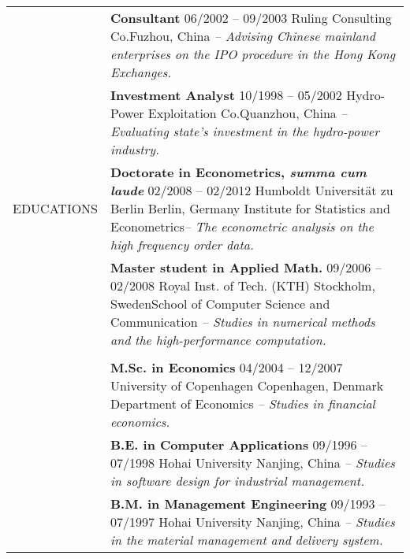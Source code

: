 \documentclass[a4paper,10pt]{article}
\begin{document}
\begin{longtable}[h]{p{}p{}}
  & \textbf{Consultant} \hfill 06/2002 -- 09/2003 \newline Ruling Consulting Co.\hfill Fuzhou, China \newline\emph{-- Advising Chinese mainland enterprises on the IPO procedure in the Hong Kong Exchanges.} \\
  & \textbf{Investment Analyst} \hfill 10/1998 -- 05/2002 \newline Hydro-Power Exploitation Co.\hfill Quanzhou, China \newline\emph{--Evaluating state's investment in the hydro-power industry.} \newline\\
EDUCATIONS
& \textbf{Doctorate in Econometrics, \emph{summa cum laude}} \hfill 02/2008 -- 02/2012 \newline Humboldt Universit\"at zu Berlin \hfill Berlin, Germany \newline Institute for Statistics and Econometrics\newline\emph{-- The econometric analysis on the high frequency order data.} \\
  & \textbf{Master student in Applied Math.} \hfill 09/2006 -- 02/2008 \newline Royal Inst. of Tech. (KTH) \hfill Stockholm, Sweden\newline School of Computer Science and Communication \newline\emph{-- Studies in numerical methods and the high-performance computation.} \\
  \\
  & \textbf{M.Sc. in Economics} \hfill 04/2004 -- 12/2007 \newline University of Copenhagen \hfill Copenhagen, Denmark  \newline Department of Economics \newline\emph{-- Studies in financial economics.}\\
  & \textbf{B.E. in Computer Applications} \hfill 09/1996 -- 07/1998 \newline Hohai University \hfill Nanjing, China \newline\emph{-- Studies in software design for industrial management.}\\
  & \textbf{B.M. in Management Engineering} \hfill 09/1993 -- 07/1997 \newline Hohai University \hfill Nanjing, China \newline\emph{-- Studies in the material management and delivery system.}\newline\\

\end{longtable}
\end{document}
